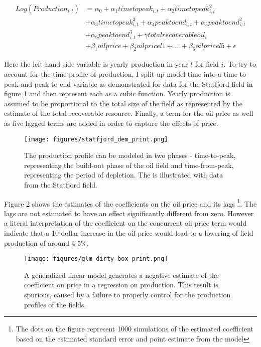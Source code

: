 \documentclass[12pt]{article}
\begin{document}
	\begin{equation}
	\begin{split}	
	 Log(Production_{i,t})  &= \alpha_0 + \alpha_1 timetopeak_{i,t} + \alpha_2 timetopeak_{i,t}^2 \\
	  \quad & + \alpha_3 timetopeak_{i,t}^3  + \alpha_4 peaktoend_{i,t} + \alpha_5 peaktoend_{i,t}^2 \\
	  \quad & + \alpha_6 peaktoend_{i,t}^3 + \gamma totalrecoverableoil_i \\
	  \quad & + \beta_1 oilprice + \beta_2 oilpricel1 + ...+ \beta_6 oilpricel5 + \epsilon	
	\label{glm_eqn}
	\end{split}
	\end{equation}

Here the left hand side variable is yearly production in year $t$ for field $i$.  To try to account for the time profile of production, I split up model-time into a time-to-peak and peak-to-end variable as demonstrated for data for the Statfjord field in figure \ref{statfjord_dem} and then represent each as a cubic function.  Yearly production is assumed to be proportional to the total size of the field as represented by the estimate of the total recoverable resource.  Finally, a term for the oil price as well as five lagged terms are added in order to capture the effects of price.  

\begin{figure}
\texttt{[image: figures/statfjord\_dem\_print.png]}
\caption{The production profile can be modeled in two phases - time-to-peak, representing the build-out phase of the oil field and time-from-peak, representing the period of depletion. The is illustrated with data from the Statfjord field.}
\label{statfjord_dem}
\end{figure}

Figure \ref{glm_dirty_box} shows the estimates of the coefficients on the oil price and its lags \footnote{The dots on the figure represent 1000 simulations of the estimated coefficient based on the estimated standard error and point estimate from the model}.  The lags are not estimated to have an effect significantly different from zero. However a literal interpretation of the coefficient on the concurrent oil price term would indicate that a 10-dollar increase in the oil price would lead to a lowering of field production of around 4-5\%.

\begin{figure}
\texttt{[image: figures/glm\_dirty\_box\_print.png]}
\caption{A generalized linear model generates a negative estimate of the coefficient on price in a regression on production.  This result is spurious, caused by a failure to properly control for the production profiles of the fields.}
\label{glm_dirty_box}
\end{figure}
\end{document}
